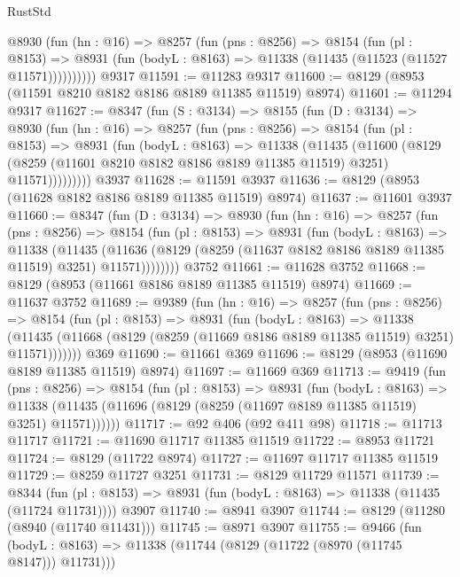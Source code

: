 \begin{lexlean}{RustStd}
\begin{coremodule}
        @8930
          (fun (hn : @16) =>
          @8257
            (fun (pns : @8256) =>
            @8154
              (fun (pl : @8153) =>
              @8931 (fun (bodyL : @8163) => @11338 (@11435 (@11523 (@11527 @11571))))))))))
    @9317
@11591 := @11283 @9317
@11600 := @8129 (@8953 (@11591 @8210 @8182 @8186 @8189 @11385 @11519) @8974)
@11601 := @11294 @9317
@11627 := @8347
    (fun (S : @3134) =>
    @8155
      (fun (D : @3134) =>
      @8930
        (fun (hn : @16) =>
        @8257
          (fun (pns : @8256) =>
          @8154
            (fun (pl : @8153) =>
            @8931
              (fun (bodyL : @8163) =>
              @11338
                (@11435
                  (@11600
                    (@8129
                      (@8259 (@11601 @8210 @8182 @8186 @8189 @11385 @11519) @3251)
                      @11571)))))))))
    @3937
@11628 := @11591 @3937
@11636 := @8129 (@8953 (@11628 @8182 @8186 @8189 @11385 @11519) @8974)
@11637 := @11601 @3937
@11660 := @8347
    (fun (D : @3134) =>
    @8930
      (fun (hn : @16) =>
      @8257
        (fun (pns : @8256) =>
        @8154
          (fun (pl : @8153) =>
          @8931
            (fun (bodyL : @8163) =>
            @11338
              (@11435
                (@11636 (@8129 (@8259 (@11637 @8182 @8186 @8189 @11385 @11519) @3251) @11571))))))))
    @3752
@11661 := @11628 @3752
@11668 := @8129 (@8953 (@11661 @8186 @8189 @11385 @11519) @8974)
@11669 := @11637 @3752
@11689 := @9389
    (fun (hn : @16) =>
    @8257
      (fun (pns : @8256) =>
      @8154
        (fun (pl : @8153) =>
        @8931
          (fun (bodyL : @8163) =>
          @11338
            (@11435 (@11668 (@8129 (@8259 (@11669 @8186 @8189 @11385 @11519) @3251) @11571)))))))
    @369
@11690 := @11661 @369
@11696 := @8129 (@8953 (@11690 @8189 @11385 @11519) @8974)
@11697 := @11669 @369
@11713 := @9419
    (fun (pns : @8256) =>
    @8154
      (fun (pl : @8153) =>
      @8931
        (fun (bodyL : @8163) =>
        @11338 (@11435 (@11696 (@8129 (@8259 (@11697 @8189 @11385 @11519) @3251) @11571))))))
@11717 := @92 @406 (@92 @411 @98)
@11718 := @11713 @11717
@11721 := @11690 @11717 @11385 @11519
@11722 := @8953 @11721
@11724 := @8129 (@11722 @8974)
@11727 := @11697 @11717 @11385 @11519
@11729 := @8259 @11727 @3251
@11731 := @8129 @11729 @11571
@11739 := @8344
    (fun (pl : @8153) => @8931 (fun (bodyL : @8163) => @11338 (@11435 (@11724 @11731))))
    @3907
@11740 := @8941 @3907
@11744 := @8129 (@11280 (@8940 (@11740 @11431)))
@11745 := @8971 @3907
@11755 := @9466
    (fun (bodyL : @8163) => @11338 (@11744 (@8129 (@11722 (@8970 (@11745 @8147))) @11731)))

\end{coremodule}
\end{lexlean}
